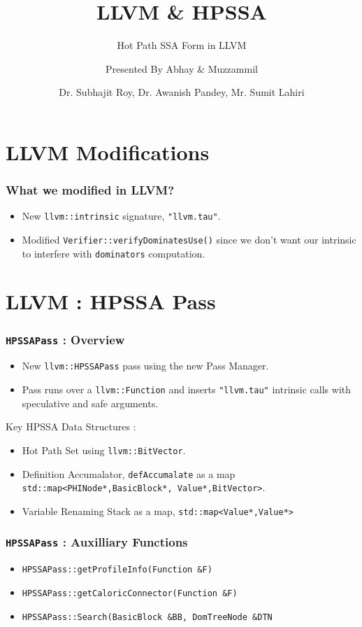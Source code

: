 \documentclass{beamer}
\title[\url{https://google.com}] %
{LLVM \& HPSSA}
\subtitle{Hot Path SSA Form in LLVM}
\author[VIP1 \& VIP2] %
{Presented By Abhay\inst{1} \& Muzzammil\inst{1}}
\institute[IDK] %
{
	\inst{1}%
	IIT Kanpur\\
	PRAISE Group
}
\date[01/03/2022] %
{Dr. Subhajit Roy, Dr. Awanish Pandey, Mr. Sumit Lahiri}
\begin{document}
\frame{\titlepage}

\section{LLVM Modifications}

\begin{frame}
	\frametitle{What we modified in LLVM?}
	\begin{itemize}
		\item New \texttt{llvm::intrinsic} signature, \texttt{"llvm.tau"}.
		\item Modified \texttt{Verifier::verifyDominatesUse()} since we don't want our intrinsic to interfere with \texttt{dominators} computation.  
	\end{itemize}
\end{frame}

\section{LLVM : HPSSA Pass}

\begin{frame}
	\frametitle{\texttt{HPSSAPass} : Overview}
	\begin{itemize}
		\item New \texttt{llvm::HPSSAPass} pass using the new Pass Manager.
		\item Pass runs over a \texttt{llvm::Function} and inserts \texttt{"llvm.tau"} intrinsic calls with speculative and safe arguments.
	\end{itemize}
	Key HPSSA Data Structures :  
	\begin{itemize}
		\item Hot Path Set using \texttt{llvm::BitVector}.
		\item Definition Accumalator, \texttt{defAccumalate} as a map  \texttt{std::map<{PHINode*,BasicBlock*}, {Value*,BitVector}>}.
		\item Variable Renaming Stack as a map, \texttt{std::map<Value*,Value*>}
	\end{itemize}
\end{frame}

\begin{frame}
	\frametitle{\texttt{HPSSAPass} : Auxilliary Functions}
	\begin{itemize}
		\item \texttt{HPSSAPass::getProfileInfo(Function \&F)}
		\item \texttt{HPSSAPass::getCaloricConnector(Function \&F)}
		\item \texttt{HPSSAPass::Search(BasicBlock \&BB, DomTreeNode \&DTN} 
	\end{itemize}
\end{frame}
\end{document}
